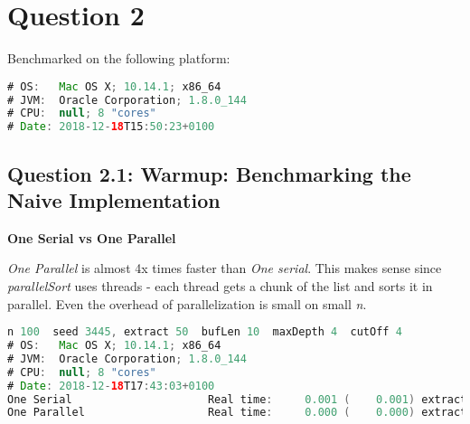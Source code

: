\documentclass[format=acmsmall, review=false, screen=true]{acmart}
\begin{document}
\section{Question 2}

Benchmarked on the following platform:

\begin{lstlisting}[language=java]
# OS:   Mac OS X; 10.14.1; x86_64
# JVM:  Oracle Corporation; 1.8.0_144
# CPU:  null; 8 "cores"
# Date: 2018-12-18T15:50:23+0100
\end{lstlisting}

\subsection{Question 2.1: Warmup: Benchmarking the Naive Implementation}


\textbf{One Serial vs One Parallel}

\emph{One Parallel} is almost 4x times faster than \emph{One serial}. This makes sense since \emph{parallelSort} uses threads - each thread gets a chunk of the list and sorts it in parallel. Even the overhead of parallelization is small on small \emph{n}.

\begin{lstlisting}[language=java]
n 100  seed 3445, extract 50  bufLen 10  maxDepth 4  cutOff 4
# OS:   Mac OS X; 10.14.1; x86_64
# JVM:  Oracle Corporation; 1.8.0_144
# CPU:  null; 8 "cores"
# Date: 2018-12-18T17:43:03+0100
One Serial                     Real time:     0.001 (    0.001) extract:    50
One Parallel                   Real time:     0.000 (    0.000) extract:    50
\end{lstlisting}
\end{document}
